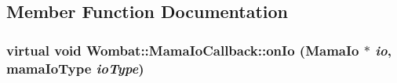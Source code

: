 \subsection{Member Function Documentation}
\hypertarget{classWombat_1_1MamaIoCallback_a78da8cc97fc5c91bc3d8689f3d662cc2}{
\subsubsection[{onIo}]{\setlength{\rightskip}{0pt plus 5cm}virtual void Wombat::MamaIoCallback::onIo ({\bf MamaIo} $\ast$ {\em io}, \/  mamaIoType {\em ioType})}}
\label{classWombat_1_1MamaIoCallback_a78da8cc97fc5c91bc3d8689f3d662cc2}
